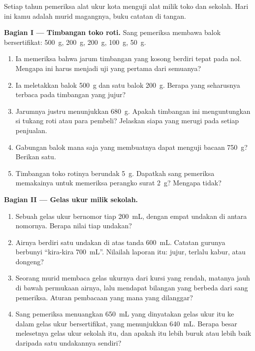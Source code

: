 \begin{problem}\label{pb:g6:measurement-in-science:1}
Setiap tahun pemeriksa alat ukur kota menguji alat milik toko dan
sekolah. Hari ini kamu adalah murid magangnya, buku catatan di tangan.

\medskip\noindent\textbf{Bagian I --- Timbangan toko roti.}
Sang pemeriksa membawa balok bersertifikat: \qty{500}{g},
\qty{200}{g}, \qty{200}{g}, \qty{100}{g}, \qty{50}{g}.
\begin{enumerate}
  \item Ia memeriksa bahwa jarum timbangan yang kosong berdiri tepat
        pada nol. Mengapa ini harus menjadi uji yang pertama dari
        semuanya?
  \item Ia meletakkan balok \qty{500}{g} dan satu balok \qty{200}{g}.
        Berapa yang seharusnya terbaca pada timbangan yang jujur?
  \item Jarumnya justru menunjukkan \qty{680}{g}. Apakah timbangan
        ini menguntungkan si tukang roti atau para pembeli? Jelaskan
        siapa yang merugi pada setiap penjualan.
  \item Gabungan balok mana saja yang membuatnya dapat menguji bacaan
        \qty{750}{g}? Berikan satu.
  \item Timbangan toko rotinya berundak \qty{5}{g}. Dapatkah sang
        pemeriksa memakainya untuk memeriksa perangko surat
        \qty{2}{g}? Mengapa tidak?
\end{enumerate}

\medskip\noindent\textbf{Bagian II --- Gelas ukur milik sekolah.}
\begin{enumerate}[resume]
  \item Sebuah gelas ukur bernomor tiap \qty{200}{mL}, dengan empat
        undakan di antara nomornya. Berapa nilai tiap undakan?
  \item Airnya berdiri satu undakan di atas tanda \qty{600}{mL}.
        Catatan gurunya berbunyi ``kira-kira \qty{700}{mL}''.
        Nilailah laporan itu: jujur, terlalu kabur, atau dongeng?
  \item Seorang murid membaca gelas ukurnya dari kursi yang rendah,
        matanya jauh di bawah permukaan airnya, lalu mendapat
        bilangan yang berbeda dari sang pemeriksa. Aturan pembacaan
        yang mana yang dilanggar?
  \item Sang pemeriksa menuangkan \qty{650}{mL} yang dinyatakan gelas
        ukur itu ke dalam gelas ukur bersertifikat, yang menunjukkan
        \qty{640}{mL}. Berapa besar melesetnya gelas ukur sekolah
        itu, dan apakah itu lebih buruk atau lebih baik daripada satu
        undakannya sendiri?
\end{enumerate}


\end{problem}
